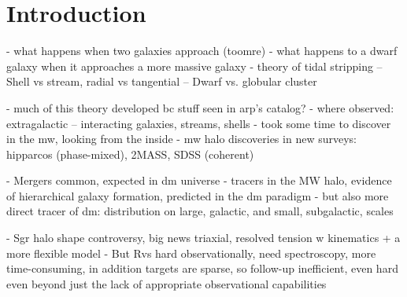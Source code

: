 \documentclass[final,5p,times,twocolumn,authoryear]{elsarticle}
\begin{document}
\begin{frontmatter}
%

\begin{keyword}



\end{keyword}

\end{frontmatter}


\section{Introduction}
\label{sec:intro}

- what happens when two galaxies approach (toomre)
- what happens to a dwarf galaxy when it approaches a more massive galaxy
- theory of tidal stripping
-- Shell vs stream, radial vs tangential
-- Dwarf vs. globular cluster

- much of this theory developed bc stuff seen in arp's catalog?
- where observed: extragalactic -- interacting galaxies, streams, shells
- took some time to discover in the mw, looking from the inside
- mw halo discoveries in new surveys: hipparcos (phase-mixed), 2MASS, SDSS (coherent)

- Mergers common, expected in dm universe
- tracers in the MW halo, evidence of hierarchical galaxy formation, predicted in the dm paradigm
- but also more direct tracer of dm: distribution on large, galactic, and small, subgalactic, scales

- Sgr halo shape controversy, big news triaxial, resolved tension w kinematics + a more flexible model
- But Rvs hard observationally, need spectroscopy, more time-consuming, in addition targets are sparse, so follow-up inefficient, even hard even beyond just the lack of appropriate observational capabilities
\end{document}
